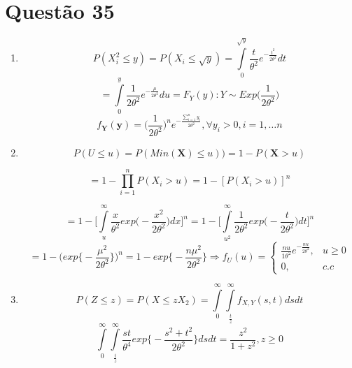 \documentclass[a4paper,12pt]{report}
\begin{document}
					\section*{Questão 35}
					 \begin{enumerate}[label=\alph*)]
					 	\item 
					 	
					 	$$P(X_i^2\le y) = 
					 	P(X_i \le \sqrt y)
					 =
					 \int\limits_0^{\sqrt y} \frac{t}{\theta^2} e^{-\frac{t^2}{2\theta^2}} dt 
					 	 $$
					 	 $$=  
					 	 \int\limits_0^{ y} \frac{1}{2\theta^2} e^{-\frac{\mu}{2\theta^2}} du = F_Y(y):Y\sim Exp\bigg(\frac{1}{2\theta^2}\bigg)
					 	 $$
					 	 $$f_{\bm Y }(\bm y) =\bigg(\frac{1}{2\theta^2}\bigg)^n e^{-\frac{\sum\limits_{i=1}^{n}y_i}{2\theta^2}}, \forall y_i>0,i=1,\ldots n  $$
					 	 \item 
					 	 $$P(U\le u) = P(Min(\bm X)\le u)) = 1- P(\bm X > u) $$
					 	 
					 	 $$= 1-\prod\limits_{i=1}^{n}P(X_i > u) = 1-[P(X_i > u)]^n $$
					 	 
					 	 $$= 1-\bigg[\int\limits_u^\infty \frac{x}{\theta^2} exp\bigg(-\frac{x^2}{2\theta^2}\bigg)dx \bigg]^n
					 	 = 1-\bigg[\int\limits_{u^2}^\infty \frac{1}{2\theta^2} exp\bigg(-\frac{t}{2\theta^2}\bigg)dt \bigg]^n
					 	  $$
					 	  $$
					 	  = 1 - \bigg(exp\bigg\{-\frac{\mu^2}{2\theta^2}\bigg\}\bigg)^n = 1 - exp\bigg\{-\frac{n\mu^2}{2\theta^2}\bigg\}
					 	  \Rightarrow f_U(u) = \begin{cases}
					 	  \frac{nu}{1\theta^2} e^{-\frac{nu}{2\theta^2}}, &u \ge 0\\
					 	  0, &c.c
					 	  \end{cases}
					 	  $$
					 	  \item $$P(Z\le z) = P(X\le zX_2) = \int\limits_0^\infty \int\limits_\frac{t}{z}^\infty f_{X,Y}(s,t)dsdt $$
					 	  $$ \int\limits_0^\infty \int\limits_\frac{t}{z}^\infty \frac{st}{\theta^4} exp\bigg\{
					 	  -\frac{s^2+t^2}{2\theta^2}
					 	  \bigg\} dsdt  
					 	  = \frac{z^2}{1+z^2}, z\ge 0
					 	  $$
					 \end{enumerate}
\end{document}
